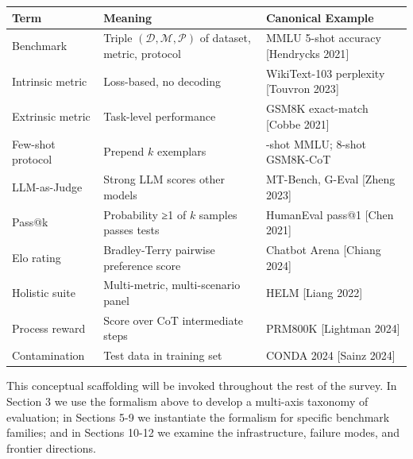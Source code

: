 {\def\LTcaptype{none} %
\begin{longtable}[]{@{}
  >{\raggedright\arraybackslash}p{}
  >{\raggedright\arraybackslash}p{}
  >{\raggedright\arraybackslash}p{}@{}}
\toprule\noalign{}
\begin{minipage}[b]{\linewidth}\raggedright
Term
\end{minipage} & \begin{minipage}[b]{\linewidth}\raggedright
Meaning
\end{minipage} & \begin{minipage}[b]{\linewidth}\raggedright
Canonical Example
\end{minipage} \\
\midrule\noalign{}
\endhead
\bottomrule\noalign{}
\endlastfoot
Benchmark & Triple \((\mathcal{D}, \mathcal{M}, \mathcal{P})\) of dataset, metric, protocol & MMLU 5-shot accuracy {[}Hendrycks 2021{]} \\
Intrinsic metric & Loss-based, no decoding & WikiText-103 perplexity {[}Touvron 2023{]} \\
Extrinsic metric & Task-level performance & GSM8K exact-match {[}Cobbe 2021{]} \\
Few-shot protocol & Prepend \(k\) exemplars & 5-shot MMLU; 8-shot GSM8K-CoT \\
LLM-as-Judge & Strong LLM scores other models & MT-Bench, G-Eval {[}Zheng 2023{]} \\
Pass@k & Probability ≥1 of \(k\) samples passes tests & HumanEval pass@1 {[}Chen 2021{]} \\
Elo rating & Bradley-Terry pairwise preference score & Chatbot Arena {[}Chiang 2024{]} \\
Holistic suite & Multi-metric, multi-scenario panel & HELM {[}Liang 2022{]} \\
Process reward & Score over CoT intermediate steps & PRM800K {[}Lightman 2024{]} \\
Contamination & Test data in training set & CONDA 2024 {[}Sainz 2024{]} \\
\end{longtable}
}

This conceptual scaffolding will be invoked throughout the rest of the survey. In Section 3 we use the formalism above to develop a multi-axis taxonomy of evaluation; in Sections 5-9 we instantiate the formalism for specific benchmark families; and in Sections 10-12 we examine the infrastructure, failure modes, and frontier directions.

